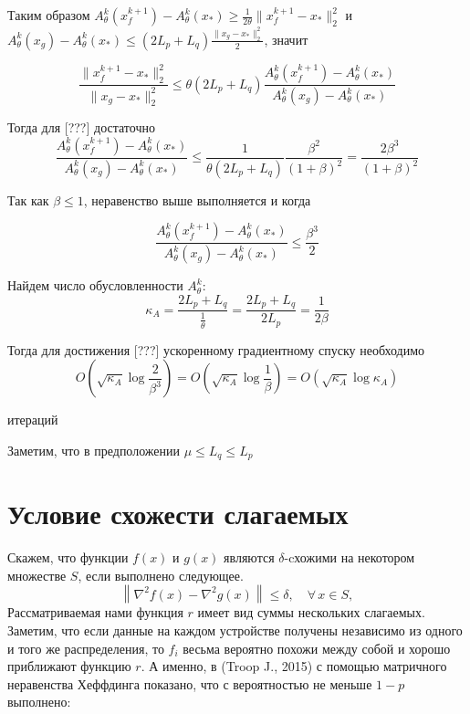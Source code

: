 \documentclass[a4paper,12pt]{extarticle}
\newcommand{\norm}[1]{\|#1\|_{2}}
\newcommand{\sqn}[1]{\norm{#1}^2}
\begin{document}
Таким образом $A_{\theta}^k(x_f^{k + 1}) - A_{\theta}^k(x_*)  \geq \frac{1}{2\theta}\sqn{x_f^{k + 1}-x_*}$
и $A_{\theta}^k(x_g) - A_{\theta}^k(x_*) \leq (2L_p + L_q) \frac{\sqn{x_g-x_*}}{2}$, значит

\[\frac{\sqn{x_f^{k + 1}-x_*}}{\sqn{x_g-x_*}} 
\leq \theta(2L_p + L_q) \frac{A_{\theta}^k(x_f^{k + 1}) -
 A_{\theta}^k(x_*)}{A_{\theta}^k(x_g) - A_{\theta}^k(x_*)}\]


Тогда для [???] %
достаточно \[\frac{A_{\theta}^k(x_f^{k + 1}) - A_{\theta}^k(x_*)}{A_{\theta}^k(x_g) - A_{\theta}^k(x_*)}
\leq \frac{1}{\theta(2L_p + L_q)} \frac{\beta^2}{(1 + \beta)^2} =
\frac{2\beta^3}{(1 + \beta)^2} \]

Так как $\beta \leq 1$, неравенство выше выполняется и когда


\[\frac{A_{\theta}^k(x_f^{k + 1}) - A_{\theta}^k(x_*)}{A_{\theta}^k(x_g) - A_{\theta}^k(x_*)}
\leq \frac{\beta^3}{2}\]



Найдем число обусловленности $A_\theta^k$: \[\kappa_A = \frac{2L_p + L_q}{\frac{1}{\theta}} = \frac{2L_p + L_q}{2L_p} = \frac{1}{2\beta}\]


Тогда для достижения [???] ускоренному градиентному спуску необходимо 
\[O\left(\sqrt{\kappa_A} \log \frac{2}{\beta^3}\right) = 
O\left(\sqrt{\kappa_A}  \log\frac{1}{\beta}\right) = 
O\left(\sqrt{\kappa_A}  \log \kappa_A\right)\]


итераций

Заметим, что в предположении $\mu \leq L_q \leq L_p$







\section{Условие схожести слагаемых}
Скажем, что функции $f(x)$ и $g(x)$ являются $\delta$-cхожими на некотором множестве $S$, если выполнено следующее. 
\begin{equation}\label{eqn:Hessian-approx-mu}
   \left\|\nabla^2 f(x) - \nabla^2 g(x)\right\| \leq \delta, 
   \quad \forall\, x\in S,
\end{equation}
Рассматриваемая нами функция $r$ имеет вид суммы нескольких слагаемых.
Заметим, что если данные на каждом устройстве получены независимо из одного
и того же распределения, то $f_i$ весьма вероятно похожи между собой и хорошо приближают функцию $r$.
А именно, в (Troop J., 2015)\cite{Troop-paper} с помощью матричного неравенства Хеффдинга показано,
что с вероятностью не меньше $1-p$ выполнено:
\end{document}
